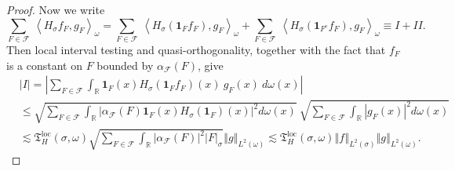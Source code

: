\documentclass{amsart}%
\theoremstyle{plain}
\numberwithin{equation}{section}
\begin{document}
\begin{proof}
Now we write%
\[
\sum_{F\in\mathcal{F}}\ \left\langle H_{\sigma}f_{F},g_{F}\right\rangle
_{\omega}=\sum_{F\in\mathcal{F}}\ \left\langle H_{\sigma}\left(
\mathbf{1}_{F}f_{F}\right)  ,g_{F}\right\rangle _{\omega}+\sum_{F\in
\mathcal{F}}\ \left\langle H_{\sigma}\left(  \mathbf{1}_{F^{c}}f_{F}\right)
,g_{F}\right\rangle _{\omega}\equiv I+II.
\]
Then local interval testing and quasi-orthogonality, together with the fact
that $f_{F}$ is a constant on $F$ bounded by $\alpha_{\mathcal{F}}\left(
F\right)  $, give%
\begin{align*}
& \left\vert I\right\vert =\left\vert \sum_{F\in\mathcal{F}}\int_{\mathbb{R}%
}\mathbf{1}_{F}\left(  x\right)  H_{\sigma}\left(  \mathbf{1}_{F}f_{F}\right)
\left(  x\right)  \ g_{F}\left(  x\right)  \ d\omega\left(  x\right)
\right\vert \\
& \leq\sqrt{\sum_{F\in\mathcal{F}}\int_{\mathbb{R}}\left\vert \alpha
_{\mathcal{F}}\left(  F\right)  \mathbf{1}_{F}\left(  x\right)  H_{\sigma
}\left(  \mathbf{1}_{F}\right)  \left(  x\right)  \right\vert ^{2}%
d\omega\left(  x\right)  }\ \sqrt{\sum_{F\in\mathcal{F}}\int_{\mathbb{R}%
}\left\vert g_{F}\left(  x\right)  \right\vert ^{2}d\omega\left(  x\right)
}\\
& \lesssim\mathfrak{T}_{H}^{\operatorname{loc}}\left(  \sigma,\omega\right)
\sqrt{\sum_{F\in\mathcal{F}}\int_{\mathbb{R}}\left\vert \alpha_{\mathcal{F}%
}\left(  F\right)  \right\vert ^{2}\left\vert F\right\vert _{\sigma}%
}\left\Vert g\right\Vert _{L^{2}\left(  \omega\right)  }\lesssim
\mathfrak{T}_{H}^{\operatorname{loc}}\left(  \sigma,\omega\right)  \left\Vert
f\right\Vert _{L^{2}\left(  \sigma\right)  }\left\Vert g\right\Vert
_{L^{2}\left(  \omega\right)  }.
\end{align*}



\end{proof}
\end{document}
